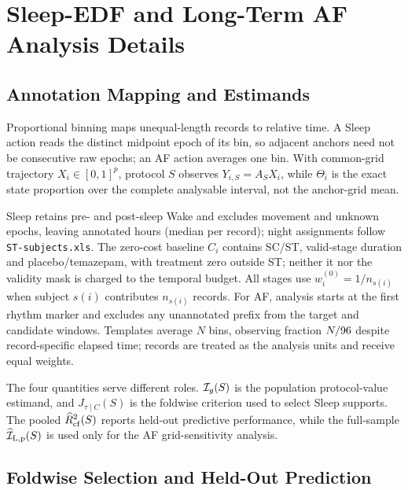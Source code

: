 \section{Sleep-EDF and Long-Term AF Analysis Details}
\label{sec:appendix-real}
\suppressfloats[t]

\subsection{Annotation Mapping and Estimands}

Proportional binning maps unequal-length records to relative time. A Sleep
action reads the distinct midpoint epoch of its bin, so adjacent anchors need
not be consecutive raw epochs; an AF action averages one bin. With common-grid
trajectory $X_i\in[0,1]^p$, protocol $S$ observes $Y_{i,S}=A_SX_i$, while
$\Theta_i$ is the exact state proportion over the complete analysable interval,
not the anchor-grid mean.

Sleep retains pre- and post-sleep Wake and excludes movement and unknown epochs,
leaving \numSleepHours{} annotated hours (median \numSleepMedian{} per record);
night assignments follow \texttt{ST-subjects.xls}. The zero-cost baseline $C_i$
contains SC/ST, valid-stage duration and placebo/temazepam, with treatment zero
outside ST; neither it nor the validity mask is charged to the temporal budget.
All stages use $w_i^{(0)}=1/n_{s(i)}$ when subject $s(i)$ contributes $n_{s(i)}$
records. For AF, analysis starts at the first rhythm marker and excludes any
unannotated prefix from the target and candidate windows. Templates average $N$
bins, observing fraction $N/96$ despite record-specific elapsed time;
records are treated as the analysis units and receive equal weights.

The four quantities serve different roles. $\mathcal{I}_g(S)$ is the population
protocol-value estimand, and $J_{\tau\mid C}(S)$ is the foldwise criterion used
to select Sleep supports. The pooled $\widehat R^2_{\rm cf}(S)$ reports
held-out predictive performance, while the full-sample
$\widehat{\mathcal{I}}_{\rm L,p}(S)$ is used only for the AF grid-sensitivity analysis.

\subsection{Foldwise Selection and Held-Out Prediction}
\label{sec:appendix-real-prediction}

